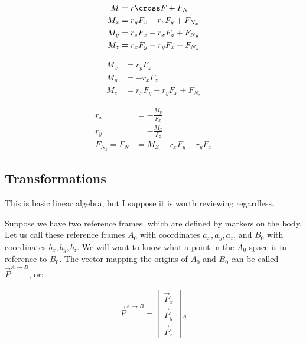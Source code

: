 \begin{equation}
\begin{split}
    M &= r\cross F + F_N \\
    M_x &= r_yF_z - r_zF_y + F_{N_x} \\
    M_y &= r_zF_x - r_xF_z + F_{N_y} \\
    M_z &= r_xF_y - r_yF_x + F_{N_z} 
\end{split}
\end{equation}

\begin{equation}
\begin{split}
    M_x &= r_yF_z \\
    M_y &= - r_xF_z \\
    M_z &= r_xF_y - r_yF_x + F_{N_z} 
\end{split}
\end{equation}

\begin{equation}
\begin{split}
    r_x &= -\frac{M_y}{F_x} \\
    r_y &= -\frac{M_x}{F_z} \\
    F_{N_z} = F_N &= M_Z - r_xF_y - r_yF_x
\end{split}
\end{equation}

\subsection{Transformations}

This is basic linear algebra, but I suppose it is worth reviewing regardless.\newline

Suppose we have two reference frames, which are defined by markers on the body. Let us call these reference frames $A_0$ with coordinates $a_x, a_y, a_z$, and $B_0$ with coordinates $b_x, b_y, b_z$. We will want to know what a point in the $A_0$ space is in reference to $B_0$. The vector mapping the origins of $A_0$ and $B_0$ can be called $\Vec{P}^{A\rightarrow B}$, or:

\begin{align}
\Vec{P}^{A\rightarrow B} =
\begin{bmatrix}
    \Vec{P}_x \\
    \Vec{P}_y \\
    \Vec{P}_z
\end{bmatrix}
{}_A
\end{align}

